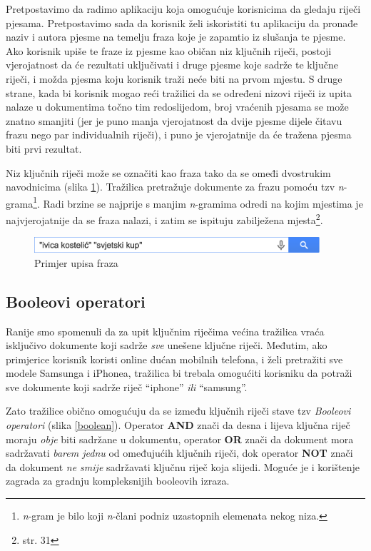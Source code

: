 \documentclass[a4paper,twoside,12pt]{scrreprt}
\begin{document}
Pretpostavimo da radimo aplikaciju koja omogućuje korisnicima da gledaju riječi pjesama. Pretpostavimo sada da korisnik želi iskoristiti tu aplikaciju da pronađe naziv i autora pjesme na temelju fraza koje je zapamtio iz slušanja te pjesme. Ako korisnik upiše te fraze iz pjesme kao običan niz ključnih riječi, postoji vjerojatnost da će rezultati uključivati i druge pjesme koje sadrže te ključne riječi, i možda pjesma koju korisnik traži neće biti na prvom mjestu. S druge strane, kada bi korisnik mogao reći tražilici da se određeni nizovi riječi iz upita nalaze u dokumentima točno tim redoslijedom, broj vraćenih pjesama se može znatno smanjiti (jer je puno manja vjerojatnost da dvije pjesme dijele čitavu frazu nego par individualnih riječi), i puno je vjerojatnije da će tražena pjesma biti prvi rezultat.

Niz ključnih riječi može se označiti kao fraza tako da se omeđi dvostrukim navodnicima (slika \ref{phrases}). Tražilica pretražuje dokumente za frazu pomoću tzv \textit{n}-grama\footnote{\textit{n}-gram je bilo koji \textit{n}-člani podniz uzastopnih elemenata nekog niza.}. Radi brzine se najprije s manjim \textit{n}-gramima odredi na kojim mjestima je najvjerojatnije da se fraza nalazi, i zatim se ispituju zabilježena mjesta\footnote{\cite{taming} str. 31}.

\begin{figure}[H]
  \centering
  \includegraphics[width=300pt]{phrases}
  \caption{Primjer upisa fraza}
  \label{phrases}
\end{figure}

\subsection{Booleovi operatori}

Ranije smo spomenuli da za upit ključnim riječima većina tražilica vraća isključivo dokumente koji sadrže \textit{sve} unešene ključne riječi. Međutim, ako primjerice korisnik koristi online dućan mobilnih telefona, i želi pretražiti sve modele Samsunga i iPhonea, tražilica bi trebala omogućiti korisniku da potraži sve dokumente koji sadrže riječ ``iphone'' \textit{ili} ``samsung''.

Zato tražilice obično omogućuju da se između ključnih riječi stave tzv \textit{Booleovi operatori} (slika \ref{boolean}). Operator \textbf{AND} znači da desna i lijeva ključna riječ moraju \textit{obje} biti sadržane u dokumentu, operator \textbf{OR} znači da dokument mora sadržavati \textit{barem jednu} od omeđujućih ključnih riječi, dok operator \textbf{NOT} znači da dokument \textit{ne smije} sadržavati ključnu riječ koja slijedi. Moguće je i korištenje zagrada za gradnju kompleksnijih booleovih izraza.
\end{document}
